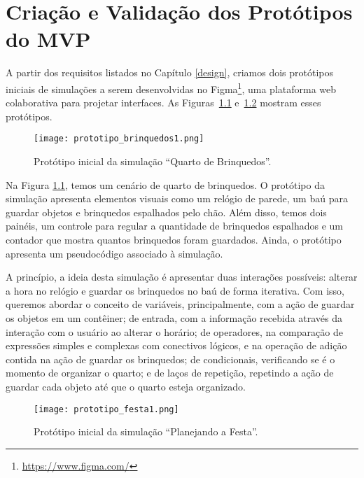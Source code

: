 
\chapter{Criação e Validação dos Protótipos do MVP}
\label{prototypes}

A partir dos requisitos listados no Capítulo \ref{design}, criamos dois protótipos iniciais de simulações a serem desenvolvidas no Figma\footnote{\url{https://www.figma.com/}}, uma plataforma web colaborativa para projetar interfaces. As Figuras~\ref{figure:brinquedos1} e~\ref{figure:festa1} mostram esses protótipos.

\begin{figure}[h!]
    \centering
    \texttt{[image: prototipo\_brinquedos1.png]}
    \caption{Protótipo inicial da simulação \enquote{Quarto de Brinquedos}.}
    \label{figure:brinquedos1}
\end{figure}

Na Figura \ref{figure:brinquedos1}, temos um cenário de quarto de brinquedos. O protótipo da simulação apresenta elementos visuais como um relógio de parede, um baú para guardar objetos e brinquedos espalhados pelo chão. Além disso, temos dois painéis, um controle para regular a quantidade de brinquedos espalhados e um contador que mostra quantos brinquedos foram guardados. Ainda, o protótipo apresenta um pseudocódigo associado à simulação.

A princípio, a ideia desta simulação é apresentar duas interações possíveis: alterar a hora no relógio e guardar os brinquedos no baú de forma iterativa. Com isso, queremos abordar o conceito de variáveis, principalmente, com a ação de guardar os objetos em um contêiner; de entrada, com a informação recebida através da interação com o usuário ao alterar o horário; de operadores, na comparação de expressões simples e complexas com conectivos lógicos, e na operação de adição contida na ação de guardar os brinquedos; de condicionais, verificando se é o momento de organizar o quarto; e de laços de repetição, repetindo a ação de guardar cada objeto até que o quarto esteja organizado.

\begin{figure}[h!]
    \centering
    \texttt{[image: prototipo\_festa1.png]}
    \caption{Protótipo inicial da simulação \enquote{Planejando a Festa}.}
    \label{figure:festa1}
\end{figure}

